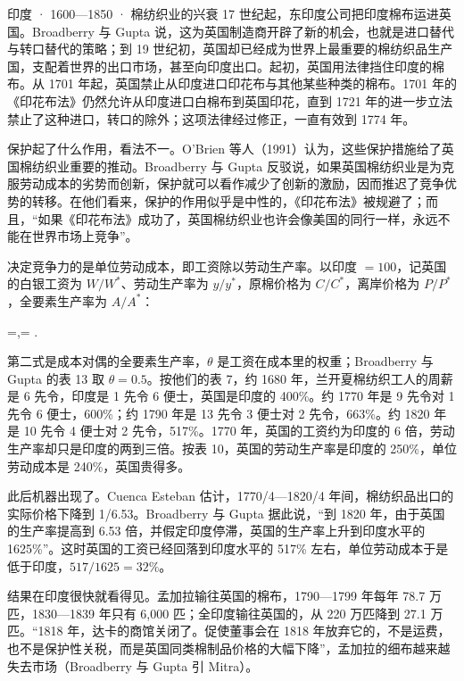 \begin{case}{印度 · 1600—1850 · 棉纺织业的兴衰}
17 世纪起，东印度公司把印度棉布运进英国。Broadberry 与 Gupta 说，这为英国制造商开辟了新的机会，也就是进口替代与转口替代的策略；到 19 世纪初，英国却已经成为世界上最重要的棉纺织品生产国，支配着世界的出口市场，甚至向印度出口\cite{bg2005}。起初，英国用法律挡住印度的棉布。从 1701 年起，英国禁止从印度进口印花布与其他某些种类的棉布。1701 年的《印花布法》仍然允许从印度进口白棉布到英国印花，直到 1721 年的进一步立法禁止了这种进口，转口的除外；这项法律经过修正，一直有效到 1774 年\cite{bg2005}。

保护起了什么作用，看法不一。O'Brien 等人（1991）认为，这些保护措施给了英国棉纺织业重要的推动。Broadberry 与 Gupta 反驳说，如果英国棉纺织业是为克服劳动成本的劣势而创新，保护就可以看作减少了创新的激励，因而推迟了竞争优势的转移\cite{bg2005}。在他们看来，保护的作用似乎是中性的，《印花布法》被规避了；而且，“如果《印花布法》成功了，英国棉纺织业也许会像美国的同行一样，永远不能在世界市场上竞争”\cite{bg2005}。

决定竞争力的是单位劳动成本，即工资除以劳动生产率。以印度 $=100$，记英国的白银工资为 $W/W^{*}$、劳动生产率为 $y/y^{*}$，原棉价格为 $C/C^{*}$，离岸价格为 $P/P^{*}$，全要素生产率为 $A/A^{*}$：
\begin{keyeq}
=,\qquad {}= .\label{eq:divergence-ulc}
\end{keyeq}
第二式是成本对偶的全要素生产率，$\theta$ 是工资在成本里的权重；Broadberry 与 Gupta 的表 13 取 $\theta=0.5$\cite{bg2005}。按他们的表 7，约 1680 年，兰开夏棉纺织工人的周薪是 6 先令，印度是 1 先令 6 便士，英国是印度的 400\%。约 1770 年是 9 先令对 1 先令 6 便士，600\%；约 1790 年是 13 先令 3 便士对 2 先令，663\%。约 1820 年是 10 先令 4 便士对 2 先令，517\%\cite{bg2005}。1770 年，英国的工资约为印度的 6 倍，劳动生产率却只是印度的两到三倍。按表 10，英国的劳动生产率是印度的 250\%，单位劳动成本是 240\%，英国贵得多\cite{bg2005}。

此后机器出现了。Cuenca Esteban 估计，1770/4—1820/4 年间，棉纺织品出口的实际价格下降到 1/6.53。Broadberry 与 Gupta 据此说，“到 1820 年，由于英国的生产率提高到 6.53 倍，并假定印度停滞，英国的生产率上升到印度水平的 1625\%”。这时英国的工资已经回落到印度水平的 517\% 左右，单位劳动成本于是低于印度，$517/1625=32\%$\cite{bg2005}。

结果在印度很快就看得见。孟加拉输往英国的棉布，1790—1799 年每年 78.7 万匹，1830—1839 年只有 6,000 匹；全印度输往英国的，从 220 万匹降到 27.1 万匹\cite{bg2005}。“1818 年，达卡的商馆关闭了。促使董事会在 1818 年放弃它的，不是运费，也不是保护性关税，而是英国同类棉制品价格的大幅下降”，孟加拉的细布越来越失去市场（Broadberry 与 Gupta 引 Mitra）\cite{bg2005}。


\end{case}
